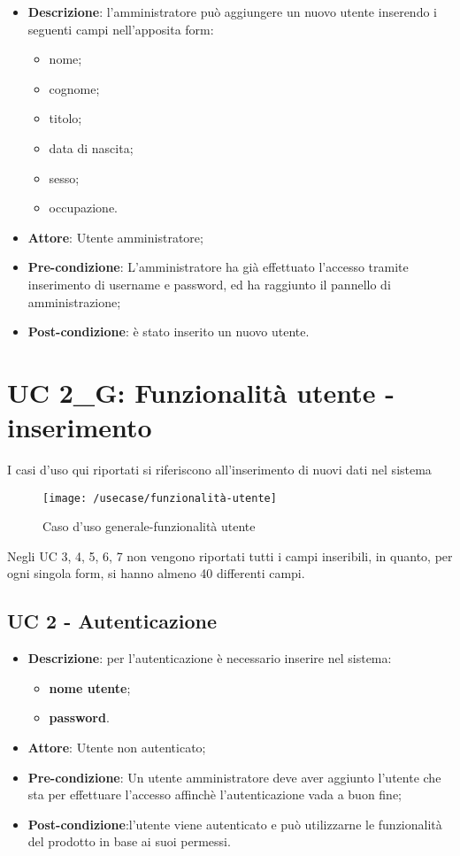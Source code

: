 \begin{itemize}
	\item \textbf{Descrizione}: l'amministratore può aggiungere un nuovo utente inserendo i seguenti campi nell'apposita form:
	\begin{itemize}
		\item nome;
		\item cognome;
		\item titolo;
		\item data di nascita;
		\item sesso;
		\item occupazione.
	\end{itemize}
	\item \textbf{Attore}: Utente amministratore;
	\item \textbf{Pre-condizione}: L'amministratore ha già effettuato l'accesso tramite inserimento di username e password, ed ha raggiunto il pannello di amministrazione;
	\item \textbf{Post-condizione}: è stato inserito un nuovo utente.
\end{itemize}

\section{UC 2\_G: Funzionalità utente - inserimento}

I casi d'uso qui riportati si riferiscono all'inserimento di nuovi dati nel sistema

\begin{figure}[h]
	\centering
	\texttt{[image: /usecase/funzionalità-utente]}
	\caption{Caso d'uso generale-funzionalità utente}
\end{figure}

Negli UC 3, 4, 5, 6, 7 non vengono riportati tutti i campi inseribili, in quanto, per ogni singola form, si hanno almeno 40 differenti campi.\\

\subsection{UC 2 - Autenticazione}

\begin{itemize}
	\item \textbf{Descrizione}: per l'autenticazione è necessario inserire nel sistema:
	\begin{itemize}
		\item \textbf{nome utente};
		\item \textbf{password}.
	\end{itemize}
	\item \textbf{Attore}: Utente non autenticato;
	\item \textbf{Pre-condizione}: Un utente amministratore deve aver aggiunto l'utente che sta per effettuare l'accesso affinchè l'autenticazione vada a buon fine;
	\item \textbf{Post-condizione}:l'utente viene autenticato e può utilizzarne le funzionalità del prodotto in base ai suoi permessi.
\end{itemize}

